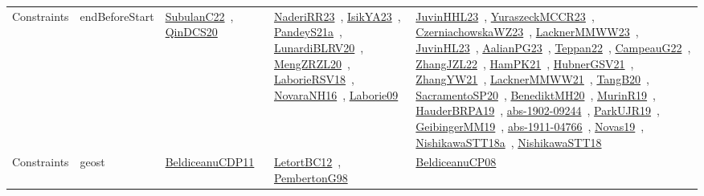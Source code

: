 {\begin{longtable}{lp{3cm}>{\raggedright\arraybackslash}p{6cm}>{\raggedright\arraybackslash}p{6cm}>{\raggedright\arraybackslash}p{8cm}}
Constraints & endBeforeStart & \href{articles/SubulanC22.pdf}{SubulanC22}~\cite{SubulanC22}, \href{articles/QinDCS20.pdf}{QinDCS20}~\cite{QinDCS20} & \href{articles/NaderiRR23.pdf}{NaderiRR23}~\cite{NaderiRR23}, \href{articles/IsikYA23.pdf}{IsikYA23}~\cite{IsikYA23}, \href{articles/PandeyS21a.pdf}{PandeyS21a}~\cite{PandeyS21a}, \href{articles/LunardiBLRV20.pdf}{LunardiBLRV20}~\cite{LunardiBLRV20}, \href{articles/MengZRZL20.pdf}{MengZRZL20}~\cite{MengZRZL20}, \href{articles/LaborieRSV18.pdf}{LaborieRSV18}~\cite{LaborieRSV18}, \href{articles/NovaraNH16.pdf}{NovaraNH16}~\cite{NovaraNH16}, \href{papers/Laborie09.pdf}{Laborie09}~\cite{Laborie09} & \href{papers/JuvinHHL23.pdf}{JuvinHHL23}~\cite{JuvinHHL23}, \href{articles/YuraszeckMCCR23.pdf}{YuraszeckMCCR23}~\cite{YuraszeckMCCR23}, \href{articles/CzerniachowskaWZ23.pdf}{CzerniachowskaWZ23}~\cite{CzerniachowskaWZ23}, \href{articles/LacknerMMWW23.pdf}{LacknerMMWW23}~\cite{LacknerMMWW23}, \href{papers/JuvinHL23.pdf}{JuvinHL23}~\cite{JuvinHL23}, \href{papers/AalianPG23.pdf}{AalianPG23}~\cite{AalianPG23}, \href{papers/Teppan22.pdf}{Teppan22}~\cite{Teppan22}, \href{articles/CampeauG22.pdf}{CampeauG22}~\cite{CampeauG22}, \href{papers/ZhangJZL22.pdf}{ZhangJZL22}~\cite{ZhangJZL22}, \href{articles/HamPK21.pdf}{HamPK21}~\cite{HamPK21}, \href{articles/HubnerGSV21.pdf}{HubnerGSV21}~\cite{HubnerGSV21}, \href{articles/ZhangYW21.pdf}{ZhangYW21}~\cite{ZhangYW21}, \href{papers/LacknerMMWW21.pdf}{LacknerMMWW21}~\cite{LacknerMMWW21}, \href{papers/TangB20.pdf}{TangB20}~\cite{TangB20}, \href{articles/SacramentoSP20.pdf}{SacramentoSP20}~\cite{SacramentoSP20}, \href{articles/BenediktMH20.pdf}{BenediktMH20}~\cite{BenediktMH20}, \href{papers/MurinR19.pdf}{MurinR19}~\cite{MurinR19}, \href{articles/HauderBRPA19.pdf}{HauderBRPA19}~\cite{HauderBRPA19}, \href{articles/abs-1902-09244.pdf}{abs-1902-09244}~\cite{abs-1902-09244}, \href{papers/ParkUJR19.pdf}{ParkUJR19}~\cite{ParkUJR19}, \href{papers/GeibingerMM19.pdf}{GeibingerMM19}~\cite{GeibingerMM19}, \href{articles/abs-1911-04766.pdf}{abs-1911-04766}~\cite{abs-1911-04766}, \href{articles/Novas19.pdf}{Novas19}~\cite{Novas19}, \href{papers/NishikawaSTT18a.pdf}{NishikawaSTT18a}~\cite{NishikawaSTT18a}, \href{papers/NishikawaSTT18.pdf}{NishikawaSTT18}~\cite{NishikawaSTT18}\\
Constraints & geost & \href{articles/BeldiceanuCDP11.pdf}{BeldiceanuCDP11}~\cite{BeldiceanuCDP11} & \href{papers/LetortBC12.pdf}{LetortBC12}~\cite{LetortBC12}, \href{papers/PembertonG98.pdf}{PembertonG98}~\cite{PembertonG98} & \href{papers/BeldiceanuCP08.pdf}{BeldiceanuCP08}~\cite{BeldiceanuCP08}\\

\end{longtable}}
